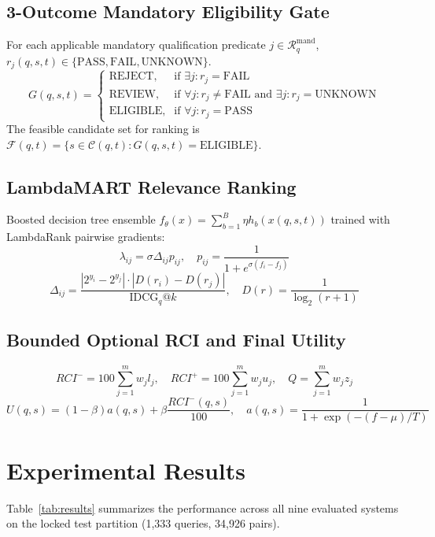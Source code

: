 \documentclass[journal,10pt,onecolumn,draftclsnofoot]{IEEEtran}
\begin{document}
\subsection{3-Outcome Mandatory Eligibility Gate}
For each applicable mandatory qualification predicate $j \in \mathcal{R}_q^{\text{mand}}$, $r_j(q,s,t) \in \{\text{PASS}, \text{FAIL}, \text{UNKNOWN}\}$.
\begin{equation}
G(q,s,t) = \begin{cases} 
\text{REJECT}, & \text{if } \exists j: r_j = \text{FAIL} \\ 
\text{REVIEW}, & \text{if } \forall j: r_j \ne \text{FAIL} \text{ and } \exists j: r_j = \text{UNKNOWN} \\ 
\text{ELIGIBLE}, & \text{if } \forall j: r_j = \text{PASS} 
\end{cases}
\end{equation}
The feasible candidate set for ranking is $\mathcal{F}(q,t) = \{s \in \mathcal{C}(q,t) : G(q,s,t) = \text{ELIGIBLE}\}$.

\subsection{LambdaMART Relevance Ranking}
Boosted decision tree ensemble $f_\theta(x) = \sum_{b=1}^B \eta h_b(x(q,s,t))$ trained with LambdaRank pairwise gradients:
\begin{equation}
\lambda_{ij} = \sigma \Delta_{ij} p_{ij}, \quad p_{ij} = \frac{1}{1 + e^{\sigma (f_i - f_j)}}
\end{equation}
\begin{equation}
\Delta_{ij} = \frac{|2^{y_i} - 2^{y_j}| \cdot |D(r_i) - D(r_j)|}{\text{IDCG}_q@k}, \quad D(r) = \frac{1}{\log_2(r+1)}
\end{equation}

\subsection{Bounded Optional RCI and Final Utility}
\begin{equation}
RCI^- = 100 \sum_{j=1}^m w_j l_j, \quad RCI^+ = 100 \sum_{j=1}^m w_j u_j, \quad Q = \sum_{j=1}^m w_j z_j
\end{equation}
\begin{equation}
U(q,s) = (1 - \beta) a(q,s) + \beta \frac{RCI^-(q,s)}{100}, \quad a(q,s) = \frac{1}{1 + \exp(-(f - \mu)/T)}
\end{equation}

\section{Experimental Results}
Table~\ref{tab:results} summarizes the performance across all nine evaluated systems on the locked test partition (1,333 queries, 34,926 pairs).
\end{document}

